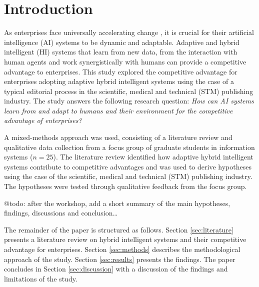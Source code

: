 \section{Introduction}
\label{sec:introduction}

As enterprises face universally accelerating change \citep{eliazarUniversalityAcceleratingChange2018}, it
is crucial for their artificial intelligence (AI) systems to be dynamic and adaptable. Adaptive and hybrid
intelligent (HI) systems that learn from new data, from the interaction with human agents and work
synergistically with humans can provide a competitive advantage to enterprises. This study explored the
competitive advantage for enterprises adopting adaptive hybrid intelligent systems using the case of a
typical editorial process in the scientific, medical and technical (STM) publishing industry. The study
answers the following research question: \textit{How can AI systems learn from and adapt to humans and
their environment for the competitive advantage of enterprises?}

A mixed-methods approach was used, consisting of a literature review and qualitative data collection from
a focus group of graduate students in information systems ($n = 25$). The literature review identified how 
adaptive hybrid intelligent systems contribute to competitive advantages and was used to derive hypotheses
using the case of the scientific, medical and technical (STM) publishing industry. The hypotheses were
tested through qualitative feedback from the focus group.

{\color{purple} @todo: after the workshop, add a short summary of the main hypotheses, findings, 
discussions and conclusion\dots}

The remainder of the paper is structured as follows. Section \ref{sec:literature} presents a literature review
on hybrid intelligent systems and their competitive advantage for enterprises. Section \ref{sec:methods} describes
the methodological approach of the study. Section \ref{sec:results} presents the findings. The paper concludes in
Section \ref{sec:discussion} with a discussion of the findings and limitations of the study.